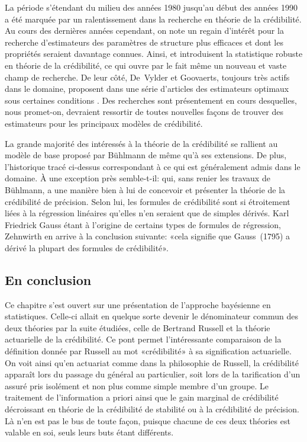 La période s'étendant du milieu des années 1980 jusqu'au début des
années 1990 a été marquée par un ralentissement dans la recherche en
théorie de la crédibilité. Au cours des dernières années cependant, on
note un regain d'intérêt pour la recherche d'estimateurs des
paramètres de structure plus efficaces et dont les propriétés seraient
davantage connues. Ainsi, \cite{Kunsch:robust:1992} et
\cite{Gisler:robust:1993} introduisent la statistique robuste en
théorie de la crédibilité, ce qui ouvre par le fait même un nouveau et
vaste champ de recherche. De leur côté, De~Vylder et Goovaerts,
toujours très actifs dans le domaine, proposent dans une série
d'articles des estimateurs optimaux sous certaines conditions
\citep{DeVylder:zeroexcess:summary:1991,%
  DeVylder:zeroexcess:classical:1992,%
  DeVylder:zeroexcess:BS:1992}. Des recherches sont présentement en
cours desquelles, nous promet-on, devraient ressortir de toutes
nouvelles façons de trouver des estimateurs pour les principaux
modèles de crédibilité.

La grande majorité des intéressés à la théorie de la crédibilité se
rallient au modèle de base proposé par Bühlmann de même qu'à ses
extensions. De plus, l'historique tracé ci-dessus correspondant à ce
qui est généralement admis dans le domaine. À une exception près
semble-t-il: \cite{Zehnwirth:studyguide:1991} qui, sans renier les
travaux de Bühlmann, a une manière bien à lui de concevoir et
présenter la théorie de la crédibilité de précision. Selon lui, les
formules de crédibilité sont si étroitement liées à la régression
linéaires qu'elles n'en seraient que de simples dérivés. Karl
Friedrick Gauss étant à l'origine de certains types de formules de
régression, Zehnwirth en arrive à la conclusion suivante: «cela
signifie que Gauss~(1795) a dérivé la plupart des formules de
crédibilité».

\subsection{En conclusion}

Ce chapitre s'est ouvert sur une présentation de l'approche bayésienne
en statistiques. Celle-ci allait en quelque sorte devenir le
dénominateur commun des deux théories par la suite étudiées, celle de
Bertrand Russell et la théorie actuarielle de la crédibilité. Ce pont
permet l'intéressante comparaison de la définition donnée par Russell
au mot «crédibilité» à sa signification actuarielle. On voit ainsi
qu'en actuariat comme dans la philosophie de Russell, la crédibilité
apparaît lors du passage du général au particulier, soit lors de la
tarification d'un assuré pris isolément et non plus comme simple
membre d'un groupe. Le traitement de l'information a priori ainsi que
le gain marginal de crédibilité décroissant en théorie de la
crédibilité de stabilité ou à la crédibilité de précision. Là n'en est
pas le bus de toute façon, puisque chacune de ces deux théories est
valable en soi, seuls leurs buts étant différents.

